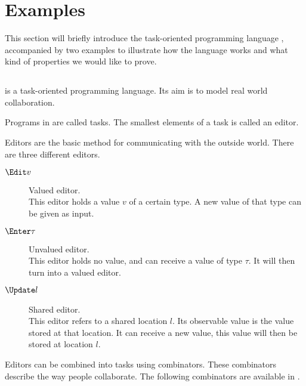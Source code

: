 

\section{Examples}
\label{sec:examples}

This section will briefly introduce the task-oriented programming language \TOPHAT,
accompanied by two examples to illustrate how the language works and what kind of properties we would like to prove.

\subsection{\TOPHAT}

\TOPHAT is a task-oriented programming language.
Its aim is to model real world collaboration.

Programs in \TOPHAT are called tasks.
The smallest elements of a task is called an editor.

Editors are the basic method for communicating with the outside world.
There are three different editors.
\begin{description}
  \item[$\Edit v$] Valued editor.\\
    This editor holds a value $v$ of a certain type.
    A new value of that type can be given as input.
  \item[$\Enter \tau$] Unvalued editor.\\
    This editor holds no value, and can receive a value of type $\tau$.
    It will then turn into a valued editor.
  \item[$\Update l$] Shared editor.\\
    This editor refers to a shared location $l$.
    Its observable value is the value stored at that location.
    It can receive a new value, this value will then be stored at location $l$.
\end{description}

Editors can be combined into tasks using combinators.
These combinators describe the way people collaborate.
The following combinators are available in \TOPHAT.

